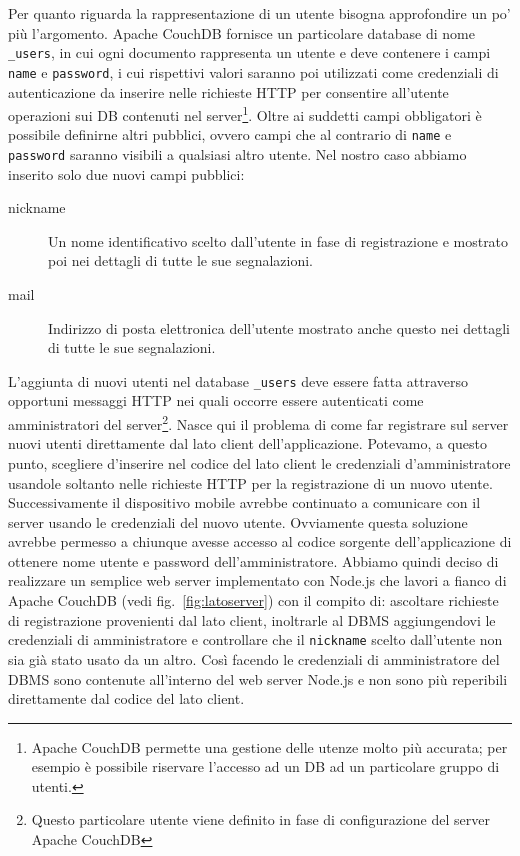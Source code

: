         \noindent Per quanto riguarda la rappresentazione di un utente bisogna approfondire
        un po' più l'argomento. Apache CouchDB\texttrademark{} fornisce un
        particolare database di nome \verb|_users|, in cui ogni documento
        rappresenta un utente e deve contenere i campi \texttt{name} e \texttt{password}, i cui
        rispettivi valori saranno poi utilizzati come credenziali di
        autenticazione da inserire nelle richieste HTTP per consentire
        all'utente operazioni sui DB contenuti nel server\footnote{
        Apache CouchDB\texttrademark{} permette una gestione delle utenze molto
        più accurata; per esempio è possibile riservare l'accesso ad un DB ad un
        particolare gruppo di utenti.}. Oltre ai suddetti campi obbligatori è
        possibile definirne altri pubblici, ovvero campi che al contrario di
        \texttt{name} e \texttt{password} saranno visibili a qualsiasi altro utente.
        Nel nostro caso abbiamo inserito solo due nuovi campi pubblici:
        \begin{description}
            \item[nickname] Un nome identificativo scelto dall'utente in fase di
                registrazione e mostrato poi nei dettagli di tutte le sue segnalazioni.
            \item[mail] Indirizzo di posta elettronica dell'utente mostrato anche questo
                nei dettagli di tutte le sue segnalazioni.
        \end{description}

        \noindent L'aggiunta di nuovi utenti nel database \verb|_users| deve essere fatta
        attraverso opportuni messaggi HTTP nei quali occorre essere autenticati
        come amministratori del server\footnote{Questo particolare utente viene
        definito in fase di configurazione del server Apache CouchDB\texttrademark{}}.
        Nasce qui il problema di come far registrare sul server nuovi utenti
        direttamente dal lato client dell'applicazione. Potevamo, a questo punto,
        scegliere d'inserire nel codice del lato client le credenziali
        d'amministratore usandole soltanto nelle richieste HTTP per la registrazione
        di un nuovo utente. Successivamente il dispositivo mobile avrebbe continuato a
        comunicare con il server usando le credenziali del nuovo utente. Ovviamente
        questa soluzione avrebbe permesso a chiunque avesse accesso al codice
        sorgente dell'applicazione di ottenere nome utente e password dell'amministratore.
        Abbiamo quindi deciso di realizzare un semplice web server implementato
        con Node.js che lavori a fianco di Apache CouchDB\texttrademark{}
        (vedi fig.~\ref{fig:latoserver}) con il
        compito di: ascoltare richieste di registrazione provenienti dal lato
        client, inoltrarle al DBMS aggiungendovi le credenziali di amministratore
        e controllare che il \texttt{nickname} scelto dall'utente non sia già
        stato usato da un altro. Così facendo le credenziali di amministratore
        del DBMS sono contenute all'interno del web server Node.js e non sono più
        reperibili direttamente dal codice del lato client.

